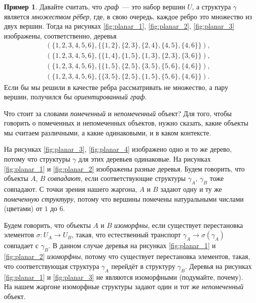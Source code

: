 \documentclass[a5paper]{article}
\theoremstyle{definition}
\newtheorem{example}{Пример}
\begin{document}
\begin{example}
Давайте считать, что \textit{граф}~--- это набор вершин \( U \), а структура \( 
\gamma \) является \textit{множеством} \textit{рёбер}, где, в свою очередь, 
каждое ребро это множество из двух вершин. Тогда на рисунках 
\ref{fig:planar_1}, \ref{fig:planar_2}, \ref{fig:planar_3} изображены, 
соответственно, деревья
\begin{eqnarray*}
	(\{1,2,3,4,5,6\}, \{ \{1,2\}, \{2,3\}, \{2,4\}, \{4,5\}, \{4,6\} \}), \\
	(\{1,2,3,4,5,6\}, \{ \{1,4\}, \{1,5\}, \{1,3\}, \{2,3\}, \{3,6\} \}), \\
	(\{1,2,3,4,5,6\}, \{ \{1,5\}, \{2,5\}, \{3,5\}, \{5,6\}, \{4,6\} \}), \\
	(\{1,2,3,4,5,6\}, \{ \{3,5\}, \{2,5\}, \{1,5\}, \{5,6\}, \{4,6\} \}).
\end{eqnarray*}
Если бы мы решили в качестве ребра рассматривать не множество, а пару вершин, 
получился бы \textit{ориентированный граф}.
\end{example}

Что стоит за словами \textit{помеченный} и \textit{непомеченный} объект? Для 
того, чтобы говорить о помеченных и непомеченных объектов, нужно сказать, какие 
объекты мы считаем различными, а какие одинаковыми, и в каком контексте.

На рисунках \ref{fig:planar_3}, \ref{fig:planar_4} изображено одно и то же 
дерево, потому что структуры \( \gamma \) для этих деревьев одинаковые. На 
рисунках 
\ref{fig:planar_1} и \ref{fig:planar_2} изображены разные деревья. Будем 
говорить, что объекты \( A \), \( B \) \textit{совпадают}, если соответствующие 
структуры \( \gamma_A \), \( \gamma_B \) тоже совпадают. С точки зрения нашего 
жаргона, 
\( A \) и \( B \) задают одну и ту же \textit{помеченную структуру}, потому что 
вершины помечены натуральными числами (цветами) от \( 1 \) до \( 6 \).

Будем говорить, что объекты \( A \) и \( B \) \textit{изоморфны}, если 
существует перестановка элементов \( \sigma \colon U_A \to U_B \), такая, что 
естественный транспорт \( \gamma_A \to \sigma(\gamma_A) \) совпадает с \( 
\gamma_B \). В данном случае деревья на рисунках \ref{fig:planar_1} и 
\ref{fig:planar_2} \textit{изоморфны}, потому что существует перестановка 
элементов, такая, что соответствующая структура \( \gamma_A \) перейдёт в 
структуру \( \gamma_B \). Деревья на рисунках \ref{fig:planar_1} и 
\ref{fig:planar_3} не являются изоморфными (подумайте, почему). На нашем 
жаргоне изоморфные структуры задают один и тот же \textit{непомеченный} объект.
\end{document}
